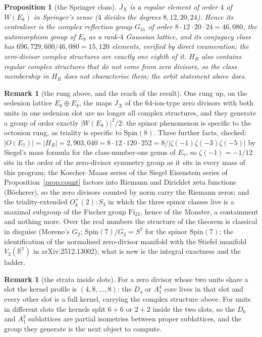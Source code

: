 \documentclass[11pt]{amsart}
\newtheorem{proposition}[theorem]{Proposition}
\theoremstyle{definition}
\newtheorem{remark}[theorem]{Remark}
\begin{document}
\begin{proposition}[the Springer class]\label{prop:springer}
$J_X$ is a regular element of order $4$ of $W(E_8)$ in Springer's sense ($4$ divides the degrees $8,12,20,24$). Hence its centraliser is the complex reflection group $G_{31}$ of order $8\cdot12\cdot20\cdot24=46{,}080$, the automorphism group of $E_8$ as a rank-$4$ Gaussian lattice, and its conjugacy class has $696{,}729{,}600/46{,}080=15{,}120$ elements, verified by direct enumeration; the zero-divisor complex structures are exactly one eighth of it. $H_R$ also contains regular complex structures that do not come from zero divisors, so the class membership in $H_R$ does not characterise them; the orbit statement above does.
\end{proposition}
\begin{remark}[the rung above, and the reach of the result]
One rung up, on the sedenion lattice $E_8\oplus E_8$, the maps $J_X$ of the $64$-ion-type zero divisors with both units in one sedenion slot are no longer all complex structures, and they generate a group of order exactly $|W(E_8)|^2/2$: the spinor phenomenon is specific to the octonion rung, as triality is specific to $\mathrm{Spin}(8)$. Three further facts, checked: $|O(E_7)|=|H_R|=2{,}903{,}040=8\cdot12\cdot120\cdot252=8/|\zeta(-1)\zeta(-3)\zeta(-5)|$ by Siegel's mass formula for the class-number-one genus of $E_7$, so $\zeta(-1)=-1/12$ sits in the order of the zero-divisor symmetry group as it sits in every mass of this program; the Koecher--Maass series of the Siegel Eisenstein series of Proposition~\ref{prop:count} factors into Riemann and Dirichlet zeta functions (B\"ocherer), so the zero divisors counted by norm carry the Riemann zeros; and the triality-extended $O_8^+(2){:}S_3$ in which the three spinor classes live is a maximal subgroup of the Fischer group $\mathrm{Fi}_{22}$, hence of the Monster, a containment and nothing more. Over the real numbers the structure of the theorem is classical in disguise (Moreno's $G_2$; $\mathrm{Spin}(7)/G_2=S^7$ for the spinor $\mathrm{Spin}(7)$; the identification of the normalised zero-divisor manifold with the Stiefel manifold $V_2(\mathbb R^7)$ in arXiv:2512.13002); what is new is the integral exactness and the ladder.
\end{remark}
\begin{remark}[the strata inside slots]
For a zero divisor whose two units share a slot the kernel profile is $(4,8,\dots,8)$: the $D_4$ or $A_1^4$ core lives in that slot and every other slot is a full kernel, carrying the complex structure above. For units in different slots the kernels split $6+6$ or $2+2$ inside the two slots, so the $D_6$ and $A_1^2$ sublattices are partial isometries between proper sublattices, and the group they generate is the next object to compute.
\end{remark}
\end{document}
